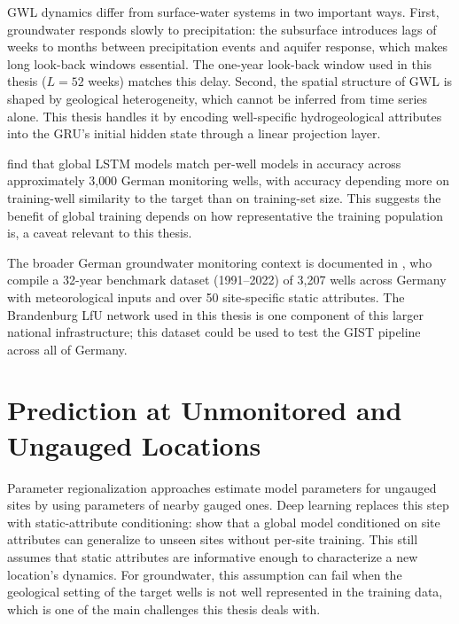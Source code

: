 GWL dynamics differ from surface-water systems in two important ways. First,
groundwater responds slowly to precipitation: the subsurface introduces lags of weeks to months between precipitation events and aquifer response, which makes long look-back windows essential. The one-year look-back window used
in this thesis ($L = 52$ weeks) matches this delay. Second, the
spatial structure of GWL is shaped by geological heterogeneity, which cannot be
inferred from time series alone. This thesis handles it by encoding well-specific hydrogeological attributes into the GRU's initial hidden state through a linear projection layer.

\citet{ohmer2026nevertrain} find that global LSTM models match per-well models in accuracy across approximately 3{,}000 German monitoring wells, with accuracy depending more on training-well similarity to the target than on training-set size. This suggests the benefit of global training depends on how representative the training population is, a caveat relevant to this thesis.

The broader German groundwater monitoring context is documented in \citet{ohmer2026gemsger},
who compile a 32-year benchmark dataset (1991--2022) of 3{,}207 wells across Germany with
meteorological inputs and over 50 site-specific static attributes. The Brandenburg LfU
network used in this thesis is one component of this larger national infrastructure; this
dataset could be used to test the GIST pipeline across all of Germany.

\section{Prediction at Unmonitored and Ungauged Locations}
\label{sec:rw_ungauged}

Parameter regionalization approaches estimate model parameters for ungauged sites by using parameters of nearby gauged ones. Deep learning replaces this step with static-attribute conditioning: \citet{kratzert2019toward} show that a global model conditioned on site attributes can generalize to unseen sites without per-site training. This still assumes that static attributes are informative enough to characterize a new location's dynamics. For groundwater, this assumption can fail when the geological setting of the target wells is not well represented in the training data, which is one of the main challenges this thesis deals with.

